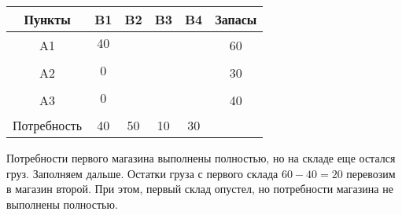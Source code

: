 \documentclass[a4paper,12pt]{article}
\begin{document}
	\begin{center}
		\begin{tabular}{|c|c|c|c|c|c|c|c|c|c}
			\hline
			Пункты & \multicolumn{2}{c|}{B1} & \multicolumn{2}{c|}{B2} & \multicolumn{2}{c|}{B3} & \multicolumn{2}{c|}{B4} & \multicolumn{1}{c|}{Запасы} \\ \hline
			\multirow{2}{*}{A1} & \multicolumn{2}{c|}{40} & \multicolumn{2}{c|}{} & \multicolumn{2}{c|}{} & \multicolumn{2}{c|}{} & \multicolumn{1}{c|}{\multirow{2}{*}{60}} \\ \cline{2-9}
			&  &  &  &  &  &  &  &  & \multicolumn{1}{c|}{} \\ \hline
			\multirow{2}{*}{A2} & \multicolumn{2}{c|}{0} & \multicolumn{2}{c|}{} & \multicolumn{2}{c|}{} & \multicolumn{2}{c|}{} & \multicolumn{1}{c|}{\multirow{2}{*}{30}} \\ \cline{2-9}
			&  &  &  &  &  &  &  &  & \multicolumn{1}{c|}{} \\ \hline
			\multirow{2}{*}{A3} & \multicolumn{2}{c|}{0} & \multicolumn{2}{c|}{} & \multicolumn{2}{c|}{} & \multicolumn{2}{c|}{} & \multicolumn{1}{c|}{\multirow{2}{*}{40}} \\ \cline{2-9}
			&  &  &  &  &  &  &  &  & \multicolumn{1}{c|}{} \\ \hline
			Потребность & \multicolumn{2}{c|}{40} & \multicolumn{2}{c|}{50} & \multicolumn{2}{c|}{10} & \multicolumn{2}{c|}{30} &  \\ \cline{1-9}
		\end{tabular}
	\end{center}
	
	Потребности первого магазина выполнены полностью, но на складе еще остался груз. Заполняем дальше. Остатки груза с первого склада $60 - 40 = 20$ перевозим в магазин второй. При этом, первый склад опустел, но потребности магазина не выполнены полностью.
	
\end{document}
